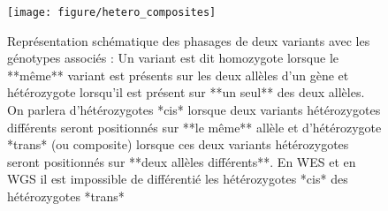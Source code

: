\documentclass[12pt,twoside]{reedthesis}
\theoremstyle{definition}
\theoremstyle{definition}
\theoremstyle{remark}
\begin{document}
  \begin{figure}
  
  {\centering \texttt{[image: figure/hetero\_composites]} 
  
  }
  
  \caption[Représentation schématique des phasages de deux variants avec les génotypes associés]{Représentation schématique des phasages de deux variants avec les génotypes associés : Un variant est dit homozygote lorsque le **même** variant est présents sur les deux allèles d'un gène et hétérozygote lorsqu'il est présent sur **un seul** des deux allèles. On parlera d'hétérozygotes *cis* lorsque deux variants hétérozygotes différents seront positionnés sur **le même** allèle et d'hétérozygote *trans* (ou composite) lorsque ces deux variants hétérozygotes seront positionnés sur **deux allèles différents**. En WES et en WGS il est impossible de différentié les hétérozygotes *cis* des hétérozygotes *trans*}\label{fig:piccompositehet}
  \end{figure}
  
\end{document}
